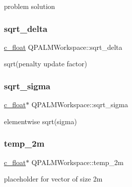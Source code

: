 problem solution 

\mbox{\label{structQPALMWorkspace_adc663b895fd02bd845677d6e928f029e}} 
\subsubsection{\texorpdfstring{sqrt\_delta}{sqrt\_delta}}
{\footnotesize\ttfamily \mbox{\hyperlink{global__opts_8h_a7f1a9fda95e52979658c20a0d134fb15}{c\+\_\+float}} Q\+P\+A\+L\+M\+Workspace\+::sqrt\+\_\+delta}



sqrt(penalty update factor) 

\mbox{\label{structQPALMWorkspace_a5628bcd9c8b6ab0ca4dd5015a0c39fb8}} 
\subsubsection{\texorpdfstring{sqrt\_sigma}{sqrt\_sigma}}
{\footnotesize\ttfamily \mbox{\hyperlink{global__opts_8h_a7f1a9fda95e52979658c20a0d134fb15}{c\+\_\+float}}$\ast$ Q\+P\+A\+L\+M\+Workspace\+::sqrt\+\_\+sigma}



elementwise sqrt(sigma) 

\mbox{\label{structQPALMWorkspace_ae351edb296d6959659a578a265c3af8a}} 
\subsubsection{\texorpdfstring{temp\_2m}{temp\_2m}}
{\footnotesize\ttfamily \mbox{\hyperlink{global__opts_8h_a7f1a9fda95e52979658c20a0d134fb15}{c\+\_\+float}}$\ast$ Q\+P\+A\+L\+M\+Workspace\+::temp\+\_\+2m}



placeholder for vector of size 2m 

\mbox{\label{structQPALMWorkspace_a43fba7da6d00e0f05d8ee75b5329f364}} 
